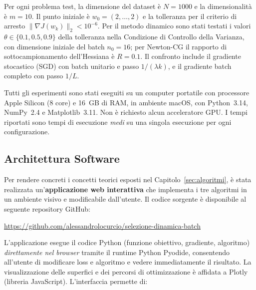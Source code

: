 Per ogni problema test, la dimensione del dataset è $N = 1000$ e la
dimensionalità è $m = 10$. Il punto iniziale è $w_0 = (2,\dots,2)$ e la
tolleranza per il criterio di arresto $\|\nabla J(w_k)\|_2 < 10^{-6}$. Per il
metodo dinamico sono stati testati i valori $\theta \in \{0.1, 0.5, 0.9\}$
della tolleranza nella Condizione di Controllo della Varianza, con dimensione
iniziale del batch $n_0 = 16$; per Newton-CG il rapporto di sottocampionamento
dell'Hessiana è $R = 0.1$. Il confronto include il gradiente stocastico (SGD)
con batch unitario e passo $1/(\lambda k)$, e il gradiente batch completo
con passo $1/L$.

Tutti gli esperimenti sono stati eseguiti su un computer portatile con
processore Apple Silicon (8 core) e 16~GB di RAM, in ambiente macOS, con
Python~3.14, NumPy~2.4 e Matplotlib~3.11. Non è richiesto alcun acceleratore
GPU. I tempi riportati sono tempi di esecuzione \emph{medi} su una singola
esecuzione per ogni configurazione.

\subsection{Architettura Software}\label{sec:architettura}

Per rendere concreti i concetti teorici esposti nel
Capitolo~\ref{sec:algoritmi}, è stata realizzata un'\textbf{applicazione web
interattiva} che implementa i tre algoritmi in un ambiente visivo e
modificabile dall'utente. Il codice sorgente è disponibile al seguente
repository GitHub:
\begin{center}
  \url{https://github.com/alessandrolocurcio/selezione-dinamica-batch}
\end{center}

L'applicazione esegue il codice Python (funzione obiettivo, gradiente,
algoritmo) \emph{direttamente nel browser} tramite il runtime Python
Pyodide, consentendo all'utente di modificare loss e algoritmo e vedere
immediatamente il risultato. La visualizzazione delle superfici e dei
percorsi di ottimizzazione è affidata a Plotly (libreria JavaScript).
L'interfaccia permette di:

